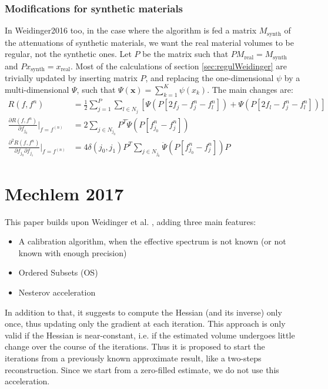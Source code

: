 \documentclass[a4paper, 10pt]{article}
\begin{document}
\subsubsection{Modifications for synthetic materials}
\label{sec:synthWeidinger}
In Weidinger2016 too, in the case where the algorithm is fed a matrix $M_{\text{synth}}$ of the attenuations of synthetic materials, we want the real material volumes to be regular, not the synthetic ones.
Let $P$ be the matrix such that $ P M_{\text{real}} = M_{\text{synth}}$ and $P x_{\text{synth}} = x_{\text{real}}$.
Most of the calculations of section \ref{sec:regulWeidinger} are trivially updated by inserting matrix $P$, and replacing the one-dimensional $\psi$ 
by a multi-dimensional $\Psi$, such that $\Psi(\boldsymbol{x}) = \sum_{k=1}^K \psi(x_k)$. The main changes are:
\begin{equation*}
\begin{split}
  R(f, f^n) &= \frac{1}{2} \sum_{j=1}^P \sum_{l \in N_j} \left[ \Psi \left(P [2 f_j - f_j^n - f_l^n] \right) + \Psi \left(P [2 f_l - f_j^n - f_l^n] \right) \right] \\
  \frac{\partial R(f, f^n)}{\partial f_{j_0}}\Bigr|_{f = f^{(n)}} &=  2 \sum_{j \in N_{j_0}} P^T \dot{\Psi}\left( P[ f_{j_0}^n - f_j^n] \right) \\
  \frac{\partial^2 R(f, f^n)}{\partial f_{j_0}\partial f_{j_1}}\Bigr|_{f = f^{(n)}} &= 4 \delta(j_0, j_1) P^T \sum_{j \in N_{j_0}} \ddot{\Psi} \left( P [f_{j_0}^n - f_j^n] \right) P
\end{split}
\end{equation*}

\section{Mechlem 2017}
This paper \cite{mechlem_joint_2017} builds upon Weidinger et al. \cite{weidinger_polychromatic_2016}, adding three main features:
\begin{itemize}
 \item A calibration algorithm, when the effective spectrum is not known (or not known with enough precision)
 \item Ordered Subsets (OS)
 \item Nesterov acceleration
\end{itemize}
In addition to that, it suggests to compute the Hessian (and its inverse) only once, thus updating only the gradient at each iteration. 
This approach is only valid if the Hessian is near-constant, i.e. if the estimated volume undergoes little change over the course of the iterations. 
Thus it is proposed to start the iterations from a previously known approximate result, like a two-steps reconstruction. 
Since we start from a zero-filled estimate, we do not use this acceleration.
\end{document}
